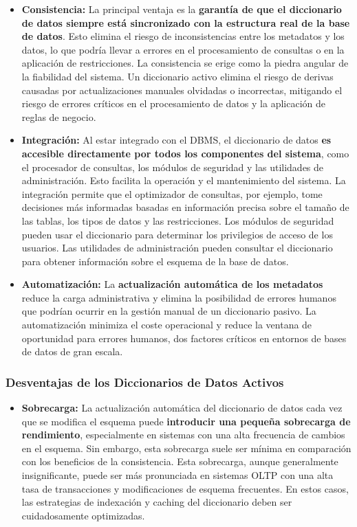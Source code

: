 \begin{itemize}
    \item \textbf{Consistencia:} La principal ventaja es la \textbf{garantía de que el diccionario de datos siempre está sincronizado con la estructura real de la base de datos}. Esto elimina el riesgo de inconsistencias entre los metadatos y los datos, lo que podría llevar a errores en el procesamiento de consultas o en la aplicación de restricciones. La consistencia se erige como la piedra angular de la fiabilidad del sistema.  Un diccionario activo elimina el riesgo de derivas causadas por actualizaciones manuales olvidadas o incorrectas, mitigando el riesgo de errores críticos en el procesamiento de datos y la aplicación de reglas de negocio.
    \item \textbf{Integración:} Al estar integrado con el DBMS, el diccionario de datos \textbf{es accesible directamente por todos los componentes del sistema}, como el procesador de consultas, los módulos de seguridad y las utilidades de administración. Esto facilita la operación y el mantenimiento del sistema.  La integración permite que el optimizador de consultas, por ejemplo, tome decisiones más informadas basadas en información precisa sobre el tamaño de las tablas, los tipos de datos y las restricciones.  Los módulos de seguridad pueden usar el diccionario para determinar los privilegios de acceso de los usuarios. Las utilidades de administración pueden consultar el diccionario para obtener información sobre el esquema de la base de datos.
    \item \textbf{Automatización:} La \textbf{actualización automática de los metadatos} reduce la carga administrativa y elimina la posibilidad de errores humanos que podrían ocurrir en la gestión manual de un diccionario pasivo. La automatización minimiza el coste operacional y reduce la ventana de oportunidad para errores humanos, dos factores críticos en entornos de bases de datos de gran escala.
\end{itemize}

\subsubsection{Desventajas de los Diccionarios de Datos Activos}

\begin{itemize}
    \item \textbf{Sobrecarga:} La actualización automática del diccionario de datos cada vez que se modifica el esquema puede \textbf{introducir una pequeña sobrecarga de rendimiento}, especialmente en sistemas con una alta frecuencia de cambios en el esquema. Sin embargo, esta sobrecarga suele ser mínima en comparación con los beneficios de la consistencia. Esta sobrecarga, aunque generalmente insignificante, puede ser más pronunciada en sistemas OLTP con una alta tasa de transacciones y modificaciones de esquema frecuentes.  En estos casos, las estrategias de indexación y caching del diccionario deben ser cuidadosamente optimizadas.
\end{itemize}

